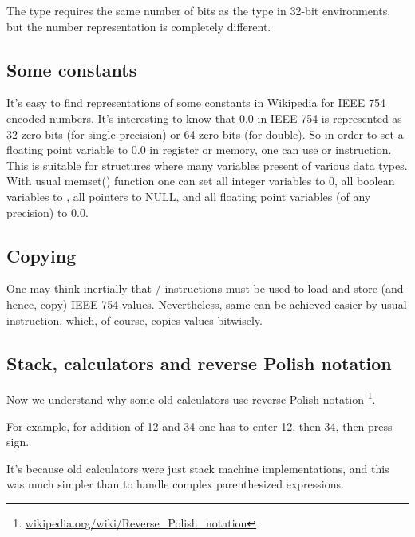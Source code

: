 The \Tfloat type requires the same number of bits as the \Tint type in 32-bit environments, 
but the number representation is completely different.





\subsection{Some constants}

It's easy to find representations of some constants in Wikipedia for IEEE 754 encoded numbers.
It's interesting to know that 0.0 in IEEE 754 is represented as 32 zero bits (for single precision) or 64 zero bits
(for double).
So in order to set a floating point variable to 0.0 in register or memory, one can use \MOV or  instruction.
This is suitable for structures where many variables present of various data types.
With usual memset() function one can set all integer variables to 0, all boolean variables to , all pointers
to NULL, and all floating point variables (of any precision) to 0.0.

\subsection{Copying}

One may think inertially that / instructions must be used to load and store (and hence, copy) IEEE 754 values.
Nevertheless, same can be achieved easier by usual  instruction, which, of course, copies values bitwisely.

\subsection{Stack, calculators and reverse Polish notation}


Now we understand why some old calculators use reverse Polish notation
\footnote{\href{http://go.yurichev.com/17354}{wikipedia.org/wiki/Reverse\_Polish\_notation}}.

For example, for addition of 12 and 34 one has to enter 12, then 34, then press  sign.

It's because old calculators were just stack machine implementations, and this was much simpler
than to handle complex parenthesized expressions.


